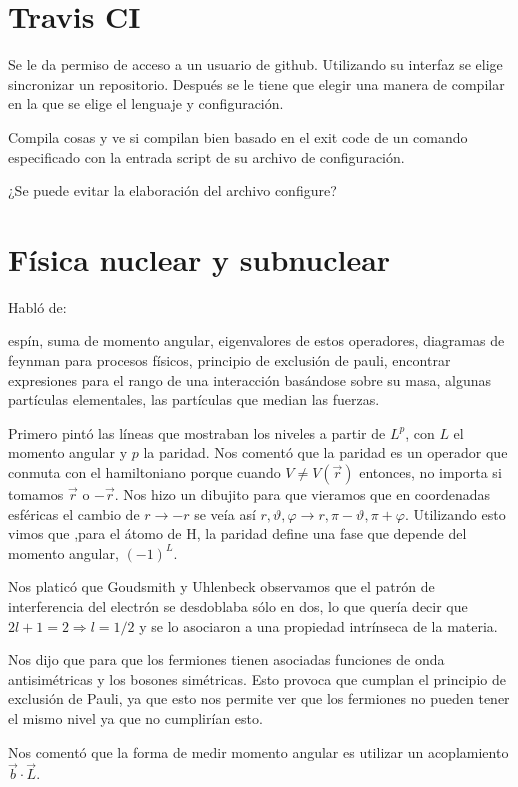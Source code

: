 \section{Travis CI}

Se le da permiso de acceso a un usuario de github.
Utilizando su interfaz se elige sincronizar un repositorio.
Después se le tiene que elegir una manera de compilar en la
que se elige el lenguaje y configuración.

Compila cosas y ve si compilan bien basado en el exit code
de un comando especificado con la entrada script de su
archivo de configuración.

¿Se puede evitar la elaboración del archivo configure?

\section{Física nuclear y subnuclear}

Habló de:

espín, suma de momento angular, eigenvalores de estos
operadores, diagramas de feynman para procesos físicos,
principio de exclusión de pauli, encontrar expresiones para
el rango de una interacción basándose sobre su masa, algunas
partículas elementales, las partículas que median las
fuerzas.

Primero pintó las líneas que mostraban los niveles a partir
de $L^p$, con $L$ el momento angular y $p$ la paridad. Nos
comentó que la paridad es un operador que conmuta con el
hamiltoniano porque cuando $V\neq V(\vec{r})$ entonces, no
importa si tomamos $\vec{r}$ o $-\vec{r}$. Nos hizo un
dibujito para que vieramos que en coordenadas esféricas el
cambio de $r\to -r$ se veía así $r,\vartheta,\varphi \to r,
\pi - \vartheta, \pi + \varphi$. Utilizando esto vimos que
,para el átomo de H, la paridad define una fase que depende
del momento angular, $(-1)^L$.

Nos platicó que Goudsmith y Uhlenbeck observamos que el
patrón de interferencia del electrón se desdoblaba sólo en
dos, lo que quería decir que $2 l + 1 = 2 \Rightarrow l =
1/2$ y se lo asociaron a una propiedad intrínseca de la
materia.

Nos dijo que para que los fermiones tienen asociadas
funciones de onda antisimétricas y los bosones simétricas.
Esto provoca que cumplan el principio de exclusión de Pauli,
ya que esto nos permite ver que los fermiones no pueden
tener el mismo nivel ya que no cumplirían esto.

Nos comentó que la forma de medir momento angular es
utilizar un acoplamiento $\vec{b}\cdot\vec{L}$.

